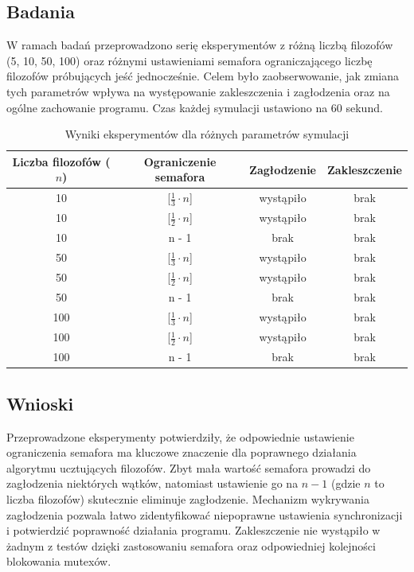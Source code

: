 \documentclass[a4paper,12pt]{article}
\begin{document}
        \subsection{Badania}
            \vspace{1em}
            W ramach badań przeprowadzono serię eksperymentów z różną liczbą filozofów (5, 10, 50, 100) oraz różnymi ustawieniami semafora ograniczającego liczbę filozofów próbujących jeść jednocześnie. Celem było zaobserwowanie, jak zmiana tych parametrów wpływa na występowanie zakleszczenia i zagłodzenia oraz na ogólne zachowanie programu. Czas każdej symulacji ustawiono na 60 sekund.
        	\vspace{1.5em}
            \begin{table}[H]
                \centering
                \begin{tabular}{|c|c|c|c|}
                    \hline
                    Liczba filozofów ($n$) & Ograniczenie semafora & Zagłodzenie & Zakleszczenie \\
                    \hline
                    10 & [$\frac{1}{3} \cdot n$] & wystąpiło & brak \\
                    10 & [$\frac{1}{2} \cdot n$] & wystąpiło & brak \\
                    10 & n - 1 & brak & brak \\
                    50 & [$\frac{1}{3} \cdot n$] & wystąpiło & brak \\
                    50 & [$\frac{1}{2} \cdot n$] & wystąpiło & brak \\
                    50 & n - 1 & brak & brak \\
                    100 & [$\frac{1}{3} \cdot n$] & wystąpiło & brak \\
                    100 & [$\frac{1}{2} \cdot n$] & wystąpiło & brak \\
                    100 & n - 1 & brak & brak \\
                    \hline
                \end{tabular}
                \caption{Wyniki eksperymentów dla różnych parametrów symulacji}
            \end{table}
        \newpage
        \vspace*{2em}
        \subsection{Wnioski}
            \vspace{1em}
            Przeprowadzone eksperymenty potwierdziły, że odpowiednie ustawienie ograniczenia semafora ma kluczowe znaczenie dla poprawnego działania algorytmu ucztujących filozofów. Zbyt mała wartość semafora prowadzi do zagłodzenia niektórych wątków, natomiast ustawienie go na $n-1$ (gdzie $n$ to liczba filozofów) skutecznie eliminuje zagłodzenie. Mechanizm wykrywania zagłodzenia pozwala łatwo zidentyfikować niepoprawne ustawienia synchronizacji i potwierdzić poprawność działania programu. Zakleszczenie nie wystąpiło w żadnym z testów dzięki zastosowaniu semafora oraz odpowiedniej kolejności blokowania mutexów.
            \vspace{1.5em}
\end{document}
